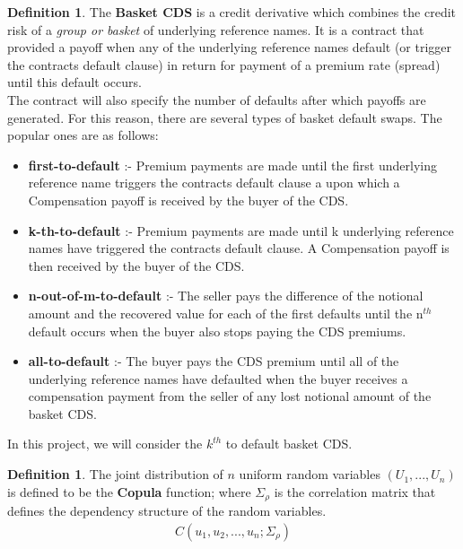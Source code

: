 \documentclass{report}
\theoremstyle{plain}
\theoremstyle{definition}
\newtheorem{defn}[thm]{Definition} %
\begin{document}
\begin{defn}
	The \textbf{Basket CDS} is a credit derivative which combines the credit risk of a \emph{group or basket} of underlying reference names. It is a contract that provided a payoff when any of the underlying reference names default (or trigger the contracts default clause) in return for payment of a premium rate (spread) until this default occurs.\\
	
	The contract will also specify the number of defaults after which payoffs are generated. For this reason, there are several types of basket default swaps. The popular ones are as follows:
	
	\begin{itemize}
		\item \textbf{first-to-default} :- Premium payments are made until the first underlying reference name triggers the contracts default clause a upon which a Compensation payoff is received by the buyer of the CDS.
		\item \textbf{k-th-to-default} :- Premium payments are made until k underlying reference names have triggered the contracts default clause. A Compensation payoff is then received by the buyer of the CDS.
		\item \textbf{n-out-of-m-to-default} :- The seller pays the difference of the notional amount and the recovered value for each of the first defaults until the n$^{th}$ default occurs when the buyer also stops paying the CDS premiums.
		\item \textbf{all-to-default} :- The buyer pays the CDS premium until all of the underlying reference names have defaulted when the buyer receives a compensation payment from the seller of any lost notional amount of the basket CDS.
	\end{itemize}
\end{defn}

In this project, we will consider the $k^{th}$ to default basket CDS.\\

\begin{defn}
	The joint distribution of $n$ uniform random variables $(U_1,...,U_n)$ is defined to be the \textbf{Copula} function; where $\Sigma_\rho$ is the correlation matrix that defines the dependency structure of the random variables.
	\begin{align*}
		C(u_1,u_2,...,u_n;\Sigma_\rho)
	\end{align*}
\end{defn}
\end{document}
